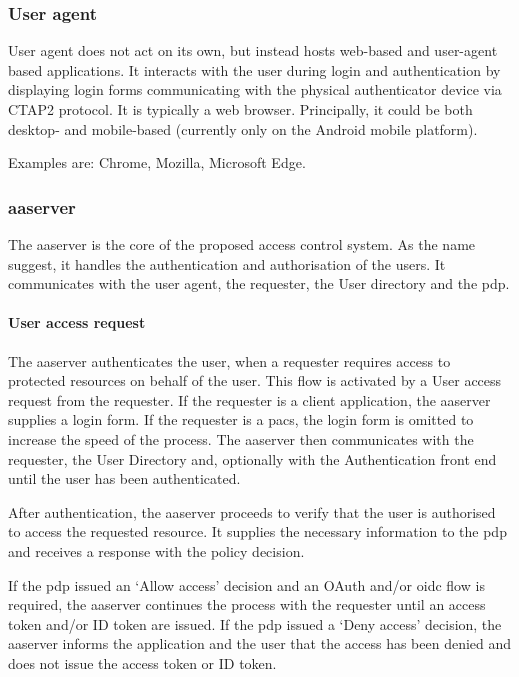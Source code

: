 \subsubsection{User agent}
User agent does not act on its own, but instead hosts web-based and user-agent based applications. It interacts with the user during login and authentication by displaying login forms communicating with the physical authenticator device via CTAP2 protocol\footnotemark. It is typically a web browser. Principally, it could be both desktop- and mobile-based (currently only on the Android mobile platform). 
% 

Examples are: Chrome, Mozilla, Microsoft Edge.

\subsubsection{\acrlong{aaserver}} 
The \acrfull{aaserver} is the core of the proposed access control system. As the name suggest, it handles the authentication and authorisation of the users. It communicates with the user agent, the requester, the User directory and the \acrshort{pdp}.
    
\paragraph{User access request}
The \acrshort{aaserver} authenticates the user, when a requester requires access to protected resources on behalf of the user. This flow is activated by a User access request from the requester. If the requester is a client application, the \acrshort{aaserver} supplies a login form. If the requester is a \acrshort{pacs}, the login form is omitted to increase the speed of the process. The \acrshort{aaserver} then communicates with the requester, the User Directory and, optionally with the Authentication front end until the user has been authenticated.

After authentication, the \acrshort{aaserver} proceeds to verify that the user is authorised to access the requested resource. It supplies the necessary information to the \acrshort{pdp} and receives a response with the policy decision.

If the \acrshort{pdp} issued an `Allow access' decision and an OAuth and/or \acrshort{oidc} flow is required, the \acrshort{aaserver} continues the process with the requester until an access token and/or ID token are issued. If the \acrshort{pdp} issued a `Deny access' decision, the \acrshort{aaserver} informs the application and the user that the access has been denied and does not issue the access token or ID token. 

